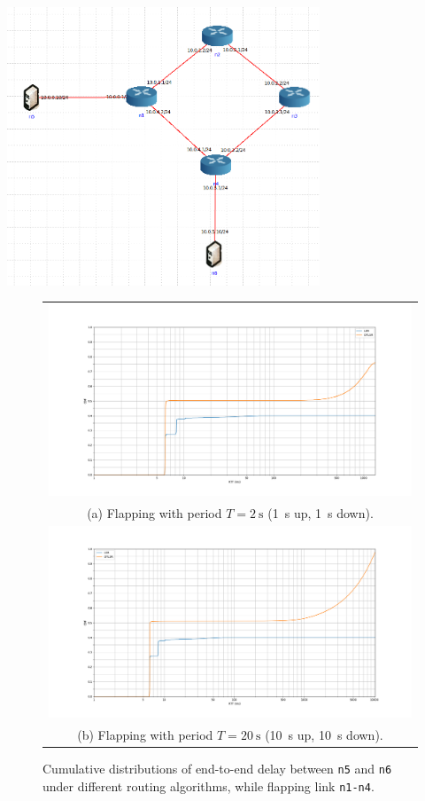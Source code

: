 \documentclass[10pt,twoside,a4paper]{article}
\begin{document}
\begin{minipage}{1\textwidth} \centering
	\includegraphics[width=0.7\textwidth]{delay_box_topology}
\end{minipage}

\begin{figure}
\begin{tabular}{c}
  \includegraphics[width=190mm]{delay_box_flap1} \\
  (a) Flapping with period $T=\SI{2}{\s}$ (\SI{1}{\s} up, \SI{1}{\s} down). \\ [6pt]
  \includegraphics[width=190mm]{delay_box_flap10} \\
  (b) Flapping with period $T=\SI{20}{\s}$ (\SI{10}{\s} up, \SI{10}{\s} down). \\[6pt]
\end{tabular}
\caption{Cumulative distributions of end-to-end delay between \texttt{n5} and \texttt{n6} under different routing algorithms, while flapping link \texttt{n1-n4}.}
\end{figure}
\end{document}
